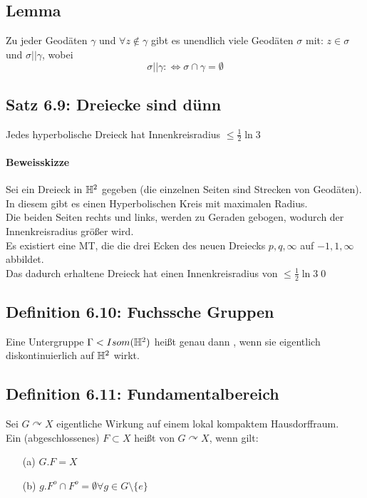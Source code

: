 \documentclass{article}
\begin{document}
\subsection{Lemma}
Zu jeder Geodäten $\gamma$ und $\forall z \notin \gamma$ gibt es unendlich viele Geodäten $\sigma$ mit: $z \in \sigma $ und $\sigma || \gamma$, wobei 
\[\sigma || \gamma : \Leftrightarrow \sigma \cap \gamma = \emptyset \]


\subsection{Satz 6.9: Dreiecke sind dünn}
Jedes hyperbolische Dreieck hat Innenkreisradius $\leq \frac{1}{2} \ln 3$

\paragraph{Beweisskizze}
Sei ein Dreieck in $\mathbb{H}^2$ gegeben (die einzelnen Seiten sind Strecken von Geodäten). In diesem gibt es einen Hyperbolischen Kreis mit maximalen Radius.\\
Die beiden Seiten rechts und links, werden zu Geraden gebogen, wodurch der Innenkreisradius größer wird.\\
Es existiert eine MT, die die drei Ecken des neuen Dreiecks $p,q, \infty$ auf $-1, 1, \infty$ abbildet.\\
Das dadurch erhaltene Dreieck hat einen Innenkreisradius von $\leq \frac{1}{2} \ln 3$\qed


\subsection{Definition 6.10: Fuchssche Gruppen}
Eine Untergruppe $\Gamma < Isom(\mathbb{H}^2)$ heißt genau dann , wenn sie eigentlich diskontinuierlich auf $\mathbb{H}^2$ wirkt.

\subsection{Definition 6.11: Fundamentalbereich}
Sei $G \curvearrowright X$ eigentliche Wirkung auf einem lokal kompaktem Hausdorffraum.\\
Ein (abgeschlossenes) $F\subset X$ heißt  von $G \curvearrowright X$, wenn gilt:
\begin{enumerate}
	\item[(a)] $G.F = X$
	\item[(b)] $g.F^o \cap F^o = \emptyset \forall g \in G\setminus\{e\}$
\end{enumerate}
\end{document}
